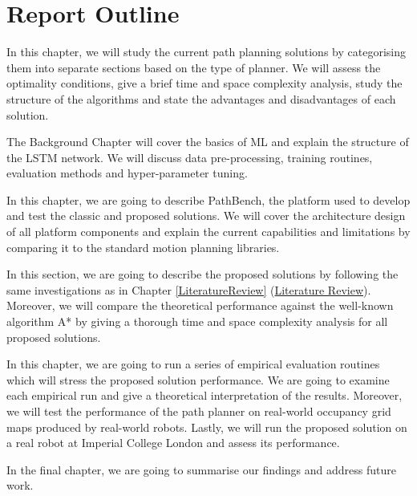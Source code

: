 \section{Report Outline}
 In this chapter, we will study the current path planning solutions by categorising them into separate sections based on the type of planner. We will assess the optimality conditions, give a brief time and space complexity analysis, study the structure of the algorithms and state the advantages and disadvantages of each solution.

 The Background Chapter will cover the basics of ML and explain the structure of the LSTM network. We will discuss data pre-processing, training routines, evaluation methods and hyper-parameter tuning.


 In this chapter, we are going to describe PathBench, the platform used to develop and test the classic and proposed solutions. We will cover the architecture design of all platform components and explain the current capabilities and limitations by comparing it to the standard motion planning libraries.

 In this section, we are going to describe the proposed solutions by following the same investigations as in Chapter \ref{LiteratureReview} (\hyperref[LiteratureReview]{Literature Review}). Moreover, we will compare the theoretical performance against the well-known algorithm A* by giving a thorough time and space complexity analysis for all proposed solutions.

 In this chapter, we are going to run a series of empirical evaluation routines which will stress the proposed solution performance. We are going to examine each empirical run and give a theoretical interpretation of the results. Moreover, we will test the performance of the path planner on real-world occupancy grid maps produced by real-world robots. Lastly, we will run the proposed solution on a real robot at Imperial College London and assess its performance.

 In the final chapter, we are going to summarise our findings and address future work.